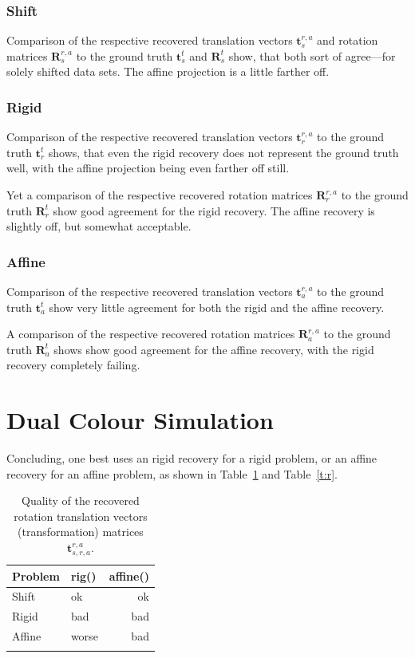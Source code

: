 \documentclass[11pt, a4paper, oneside, twocolumn]{report}
\renewcommand{\b}{\textbf}
\begin{document}
\subsubsection{Shift}

Comparison of the respective recovered translation vectors
$\b{t}_s^{r,a}$ and rotation matrices $\b{R}_s^{r,a}$ to the ground
truth $\b{t}_s^{t}$ and $\b{R}_s^{t}$ show, that both sort of
agree---for solely shifted data sets. The affine projection is a
little farther off.


\subsubsection{Rigid}

Comparison of the respective recovered translation vectors
$\b{t}_r^{r,a}$ to the ground truth $\b{t}_r^{t}$ shows, that even the
rigid recovery does not represent the ground truth well, with the
affine projection being even farther off still.

Yet a comparison of the respective recovered rotation matrices
$\b{R}_r^{r,a}$ to the ground truth $\b{R}_r^{t}$ show good agreement
for the rigid recovery. The affine recovery is slightly off, but
somewhat acceptable.


\subsubsection{Affine}

Comparison of the respective recovered translation vectors
$\b{t}_a^{r,a}$ to the ground truth $\b{t}_a^{t}$ show very little
agreement for both the rigid and the affine recovery.

A comparison of the respective recovered rotation
matrices $\b{R}_a^{r,a}$ to the ground truth $\b{R}_a^{t}$ shows show
good agreement for the affine recovery, with the rigid recovery
completely failing.


\section{Dual Colour Simulation}

Concluding, one best uses an rigid recovery for a rigid problem, or an
affine recovery for an affine problem, as shown in Table~\ref{t:t} and
Table~\ref{t:r}.

\begin{table}[!htb]
  \caption{Quality of the recovered rotation translation vectors
    (transformation) matrices $\b{t}_{s,r,a}^{r,a}$.}\label{t:t}
  \begin{tabularx}{.5\textwidth}{X l r}
    \hhline{===}
    Problem & rig() & affine() \\
    \hline
    Shift & ok & ok \\
    Rigid & bad & bad \\
    Affine & worse & bad \\
    \hhline{===}
  \end{tabularx}
\end{table}
\end{document}
